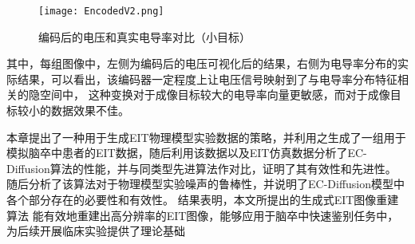 \begin{figure}[H]
    \centering
    \texttt{[image: EncodedV2.png]}
    \caption{编码后的电压和真实电导率对比（小目标）}
    \label{figure:EncodedV2}
\end{figure}

其中，每组图像中，左侧为编码后的电压可视化后的结果，右侧为电导率分布的实际结果，可以看出，该编码器一定程度上让电压信号映射到了与电导率分布特征相关的隐空间中，
这种变换对于成像目标较大的电导率向量更敏感，而对于成像目标较小的数据效果不佳。
 







本章提出了一种用于生成EIT物理模型实验数据的策略，并利用之生成了一组用于模拟脑卒中患者的EIT数据，随后利用该数据以及EIT仿真数据分析了EC-Diffusion算法的性能，并与同类型先进算法作对比，证明了其有效性和先进性。
随后分析了该算法对于物理模型实验噪声的鲁棒性，并说明了EC-Diffusion模型中各个部分存在的必要性和有效性。
结果表明，本文所提出的生成式EIT图像重建算法
能有效地重建出高分辨率的EIT图像，能够应用于脑卒中快速鉴别任务中，为后续开展临床实验提供了理论基础
